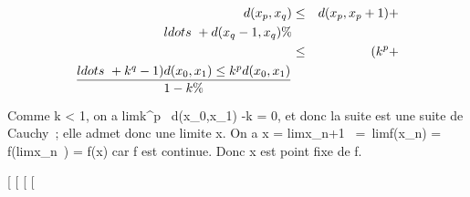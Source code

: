 \documentclass[]{article}
\begin{document}
\begin{align*} d(x_p,x_q)& \leq&
d(x_p,x_p+1) +
\\ldots~ +
d(x_q-1,x_q) \%& \\ &
\leq& (k^p +
\\ldots~ +
k^q-1)d(x_ 0,x_1) \leq k^p
d(x_0,x_1) \over 1 - k \%&
\\ \end{align*}

Comme k \textless{} 1, on a
limk^p~
d(x_0,x_1) -k = 0, et donc la
suite est une suite de Cauchy~; elle admet donc une limite x. On a x
= limx_n+1~ =\
limf(x_n) = f(limx_n~) =
f(x) car f est continue. Donc x est point fixe de f.

{[}
{[}
{[}
{[}
\end{document}
